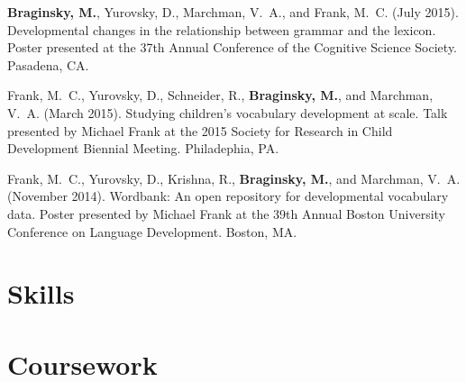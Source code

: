\documentclass[11pt,letter]{moderncv}
\begin{document}
\begin{small}
\begin{thebibliography}{}
\textbf{Braginsky, M.}, Yurovsky, D., Marchman, V.~A., and Frank, M.~C. (July 2015).
\newblock Developmental changes in the relationship between grammar and the
  lexicon.
\newblock Poster presented at the 37th Annual Conference of the Cognitive Science Society.
  Pasadena, CA.

Frank, M.~C., Yurovsky, D., Schneider, R., \textbf{Braginsky, M.}, and Marchman, V.~A. (March 2015).
\newblock Studying children's vocabulary development at scale.
\newblock Talk presented by Michael Frank at the 2015 Society for Research in Child
  Development Biennial Meeting.
  Philadephia, PA.

Frank, M.~C., Yurovsky, D., Krishna, R., \textbf{Braginsky, M.}, and Marchman, V.~A. (November 2014).
\newblock Wordbank: An open repository for developmental vocabulary data.
\newblock Poster presented by Michael Frank at the 39th Annual Boston University
  Conference on Language Development.
  Boston, MA.
 
\end{thebibliography}
\end{small}


%

%


%

%

\vspace*{0.25em}

\section{Skills}

\vspace*{0.25em}

\section{Coursework}
\end{document}

